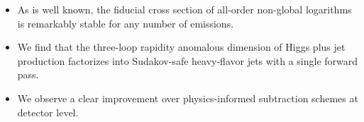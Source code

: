 \begin{itemize}
  \item As is well known, the fiducial cross section of all-order non-global logarithms is remarkably stable for any number of emissions.
  \item We find that the three-loop rapidity anomalous dimension of Higgs plus jet production factorizes into Sudakov-safe heavy-flavor jets with a single forward pass.
  \item We observe a clear improvement over physics-informed subtraction schemes at detector level.
\end{itemize}

